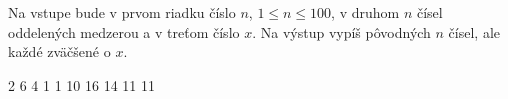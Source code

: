 




Na vstupe bude v prvom riadku číslo $n$, $1\leq n\leq 100$, v druhom $n$ čísel oddelených medzerou a v treťom číslo $x$.
Na výstup vypíš pôvodných $n$ čísel, ale každé zväčšené o $x$.

2 6 4 1 1
10
 16 14 11 11 
\koniec


